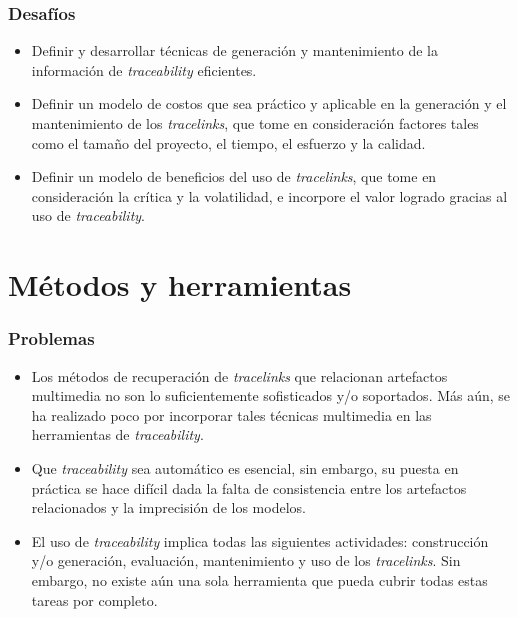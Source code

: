 \documentclass[a4paper,12pt,oneside,spanish]{book}
\begin{document}
\subsubsection{Desafíos}

\begin{itemize}[label={\checkmark}]

\item Definir y desarrollar técnicas de generación y mantenimiento de la información de \textit{traceability} eficientes.

\item Definir un modelo de costos que sea práctico y aplicable en la generación y el mantenimiento de los \textit{tracelinks}, que tome en consideración factores tales como el tamaño del proyecto, el tiempo, el esfuerzo y la calidad.

\item Definir un modelo de beneficios del uso de \textit{tracelinks}, que tome en consideración la crítica y la volatilidad, e incorpore el valor logrado gracias al uso de \textit{traceability}.

\end{itemize}

\section{Métodos y herramientas}

\subsubsection{Problemas}

\begin{itemize}[label={$\times$}]

\item Los métodos de recuperación de \textit{tracelinks} que relacionan artefactos multimedia no son lo suficientemente sofisticados y/o soportados. Más aún, se ha realizado poco por incorporar tales técnicas multimedia en las herramientas de \textit{traceability}.

\item Que \textit{traceability} sea automático es esencial, sin embargo, su puesta en práctica se hace difícil dada la falta de consistencia entre los artefactos relacionados y la imprecisión de los modelos.

\item El uso de \textit{traceability} implica todas las siguientes actividades: construcción y/o generación, evaluación, mantenimiento y uso de los \textit{tracelinks}. Sin embargo, no existe aún una sola herramienta que pueda cubrir todas estas tareas por completo.

\end{itemize}
\end{document}
